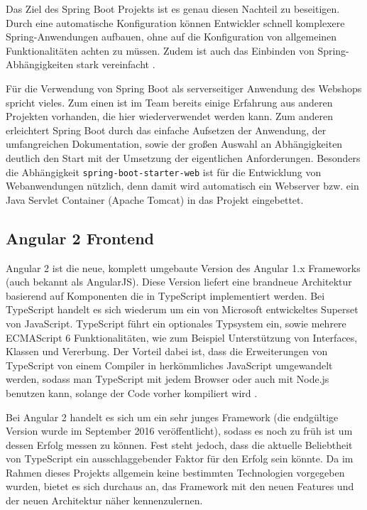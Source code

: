 Das Ziel des Spring Boot Projekts ist es genau diesen Nachteil zu beseitigen. Durch eine automatische Konfiguration können Entwickler schnell komplexere Spring-Anwendungen aufbauen, ohne auf die Konfiguration von allgemeinen Funktionalitäten achten zu müssen.
Zudem ist auch das Einbinden von Spring-Abhängigkeiten stark vereinfacht \cite{Webb2013}.

Für die Verwendung von Spring Boot als serverseitiger Anwendung des Webshops spricht vieles.
Zum einen ist im Team bereits einige Erfahrung aus anderen Projekten vorhanden, die hier wiederverwendet werden kann.
Zum anderen erleichtert Spring Boot durch das einfache Aufsetzen der Anwendung, der umfangreichen Dokumentation, sowie der großen Auswahl an Abhängigkeiten deutlich den Start mit der Umsetzung der eigentlichen Anforderungen.
Besonders die Abhängigkeit \texttt{spring-boot-starter-web} ist für die Entwicklung von Webanwendungen nützlich, denn damit wird automatisch ein Webserver bzw. ein Java Servlet Container (Apache Tomcat) in das Projekt eingebettet.

\subsection{Angular 2 Frontend}\label{angular_arch}

Angular 2 ist die neue, komplett umgebaute Version des Angular 1.x Frameworks (auch bekannt als AngularJS).
Diese Version liefert eine brandneue Architektur basierend auf Komponenten die in TypeScript implementiert werden.
Bei TypeScript handelt es sich wiederum um ein von Microsoft entwickeltes Superset von JavaScript.
TypeScript führt ein optionales Typsystem ein, sowie mehrere ECMAScript 6 Funktionalitäten, wie zum Beispiel Unterstützung von Interfaces, Klassen und Vererbung.
Der Vorteil dabei ist, dass die Erweiterungen von TypeScript von einem Compiler in herkömmliches JavaScript umgewandelt werden, sodass man TypeScript mit jedem Browser oder auch mit Node.js benutzen kann, solange der Code vorher kompiliert wird \cite{Deeleman2016}.

Bei Angular 2 handelt es sich um ein sehr junges Framework (die endgültige Version wurde im September 2016 veröffentlicht), sodass es noch zu früh ist um dessen Erfolg messen zu können.
Fest steht jedoch, dass die aktuelle Beliebtheit von TypeScript ein ausschlaggebender Faktor für den Erfolg sein könnte.
Da im Rahmen dieses Projekts allgemein keine bestimmten Technologien vorgegeben wurden, bietet es sich durchaus an, das Framework mit den neuen Features und der neuen Architektur näher kennenzulernen.

